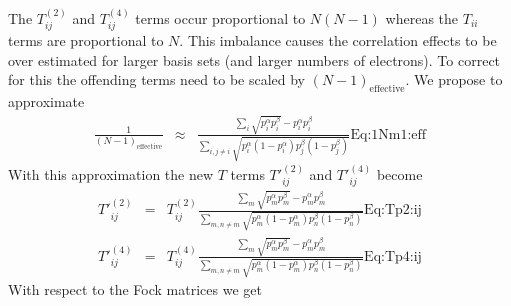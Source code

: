 \documentclass[pra,nofootinbib]{revtex4-1}
\newcommand{\dlabel}[1]{\text{#1}\label{#1}}
\begin{document}
The $T^{(2)}_{ij}$ and $T^{(4)}_{ij}$ terms occur proportional to $N(N-1)$ whereas
the $T_{ii}$ terms are proportional to $N$. This imbalance causes the correlation
effects to be over estimated for larger basis sets (and larger numbers of electrons).
To correct for this the offending terms need to be scaled by $(N-1)_\mathrm{effective}$.
We propose to approximate
\begin{eqnarray}
   \frac{1}{(N-1)_\mathrm{effective}}
   &\approx&
   \frac{\sum_{i}\sqrt{p^\alpha_i p^\beta_i}-p^\alpha_i p^\beta_i}
        {\sum_{i,j\ne i}\sqrt{p^\alpha_i(1-p^\alpha_i)p^\beta_j(1-p^\beta_j)}}
   \dlabel{Eq:1Nm1:eff}
\end{eqnarray}
With this approximation the new $T$ terms $T'^{(2)}_{ij}$ and $T'^{(4)}_{ij}$
become
\begin{eqnarray}
   T'^{(2)}_{ij} &=& 
   T^{(2)}_{ij}
   \frac{\sum_{m}\sqrt{p^\alpha_m p^\beta_m}-p^\alpha_m p^\beta_m}
        {\sum_{m,n\ne m}\sqrt{p^\alpha_m(1-p^\alpha_m)p^\beta_n(1-p^\beta_n)}}
   \dlabel{Eq:Tp2:ij} \\
   T'^{(4)}_{ij} &=& 
   T^{(4)}_{ij}
   \frac{\sum_{m}\sqrt{p^\alpha_m p^\beta_m}-p^\alpha_m p^\beta_m}
        {\sum_{m,n\ne m}\sqrt{p^\alpha_m(1-p^\alpha_m)p^\beta_n(1-p^\beta_n)}}
   \dlabel{Eq:Tp4:ij}
\end{eqnarray}
With respect to the Fock matrices we get
\end{document}
